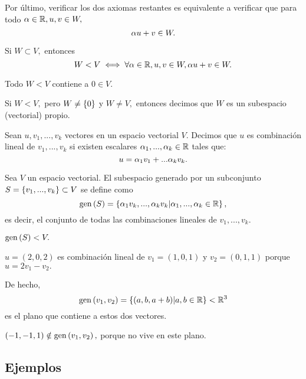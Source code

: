 Por último, verificar los dos axiomas restantes es equivalente a verificar que para todo $\alpha \in \mathbb{R}, u,v \in W,$
$$
\alpha u + v \in W.
$$

\begin{proposicion}
 Si $W\subset V,$ entonces $$
W < V \iff \forall \alpha \in \mathbb{R}, u,v \in W, \alpha u+v\in W.
 $$
\end{proposicion}

\begin{corolario}
 Todo $W < V$ contiene a $0 \in V.$
\end{corolario}


\begin{definicion}
 Si $W< V,$ pero $W\neq\left\{ 0 \right\}$ y $W\neq V,$ entonces decimos que $W$ es un subespacio (vectorial) propio.
\end{definicion}

\begin{definicion}
 Sean $u,v_{1},...,v_{k}$ vectores en un espacio vectorial $V.$ Decimos que $u$ es combinaci\'on lineal de
$v_{1},...,v_{k}$ si existen escalares $\alpha_{1},...,\alpha_{k}\in \mathbb{R}$ tales que:
$$
u=\alpha_{1}v_{1}+...\alpha_{k}v_{k}.
$$
\end{definicion}

\begin{definicion}
 Sea $V$ un espacio vectorial. El subespacio generado por un subconjunto $S=\left\{ v_{1},...,v_{k} \right\}\subset V$ se define
como
 $$
\operatorname{gen}\left( S \right)=\left\{ \alpha_{1}v_{k},...,\alpha_{k}v_{k}\arrowvert \alpha_{1},...,\alpha_{k}\in \mathbb{R} \right\},
 $$
 es decir, el conjunto de todas las combinaciones lineales de $v_{1},...,v_{k}.$
\end{definicion}

\begin{observacion}
 $\operatorname{gen}\left( S \right)<V.$
\end{observacion}


\begin{resuelto}
 $u=(2,0,2)$ es combinaci\'on lineal de $v_{1}=(1,0,1)$ y $v_{2}=(0,1,1)$ porque $u=2v_{1}-v_{2}.$

 De hecho, $$\operatorname{gen}\left( v_{1},v_{2} \right)=\left\{ (a,b,a+b)\arrowvert a,b \in \mathbb{R} \right\}<\mathbb{R}^{3}$$ es el plano que contiene a estos dos vectores.

 $(-1,-1,1)\notin \operatorname{gen}\left( v_{1},v_{2} \right),$ porque no vive en este plano.
\end{resuelto}





\subsection*{Ejemplos}

